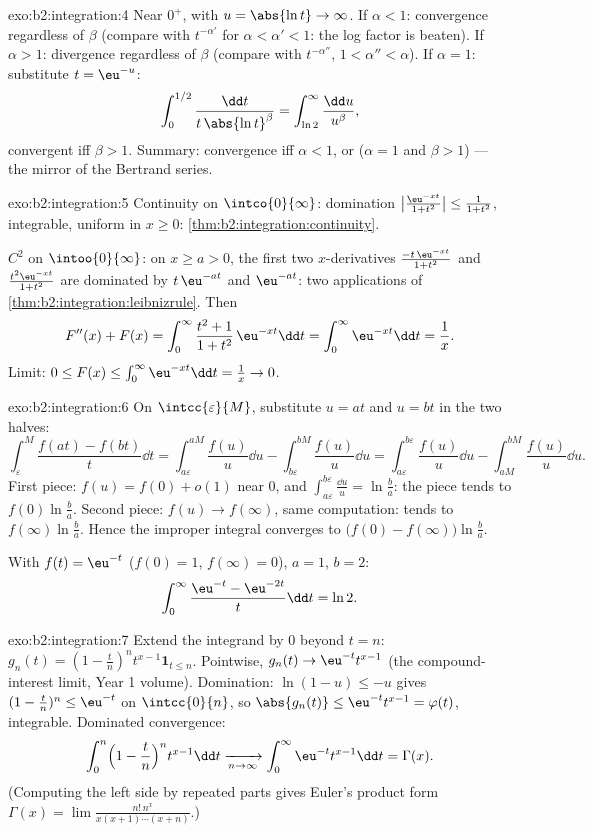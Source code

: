 \begin{solution}{exo:b2:integration:4}
Near $0^+$, with $u = \abs{\ln t} \to \infty$. If $\alpha < 1$:
convergence regardless of $\beta$ (compare with $t^{-\alpha'}$ for
$\alpha < \alpha' < 1$: the log factor is beaten). If $\alpha > 1$:
divergence regardless of $\beta$ (compare with $t^{-\alpha''}$,
$1 < \alpha'' < \alpha$). If $\alpha = 1$: substitute $t =
\eu^{-u}$:
\[
\int_0^{1/2} \frac{\dd t}{t\,\abs{\ln t}^\beta}
= \int_{\ln 2}^{\infty} \frac{\dd u}{u^\beta},
\]
convergent iff $\beta > 1$. Summary: convergence iff $\alpha < 1$,
or ($\alpha = 1$ and $\beta > 1$) --- the mirror of the Bertrand
series.
\end{solution}

\begin{solution}{exo:b2:integration:5}
Continuity on $\intco{0}{\infty}$: domination
$\bigl|\frac{\eu^{-xt}}{1+t^2}\bigr| \leq \frac{1}{1+t^2}$,
integrable, uniform in $x \geq 0$:
\cref{thm:b2:integration:continuity}.

$C^2$ on $\intoo{0}{\infty}$: on $x \geq a > 0$, the first two
$x$-derivatives $\frac{-t\,\eu^{-xt}}{1+t^2}$ and
$\frac{t^2\eu^{-xt}}{1+t^2}$ are dominated by $t\,\eu^{-at}$ and
$\eu^{-at}$: two applications of
\cref{thm:b2:integration:leibnizrule}. Then
\[
F''(x) + F(x) = \int_0^\infty \frac{t^2 + 1}{1 + t^2}\,\eu^{-xt}\dd
t = \int_0^\infty \eu^{-xt}\dd t = \frac1x .
\]
Limit: $0 \leq F(x) \leq \int_0^\infty \eu^{-xt}\dd t = \frac1x \to
0$.
\end{solution}

\begin{solution}{exo:b2:integration:6}
On $\intcc{\varepsilon}{M}$, substitute $u = at$ and $u = bt$ in
the two halves:
\[
\int_\varepsilon^M \frac{f(at) - f(bt)}{t}\dd t
= \int_{a\varepsilon}^{aM}\frac{f(u)}{u}\dd u
- \int_{b\varepsilon}^{bM}\frac{f(u)}{u}\dd u
= \int_{a\varepsilon}^{b\varepsilon} \frac{f(u)}{u}\dd u
- \int_{aM}^{bM} \frac{f(u)}{u}\dd u .
\]
First piece: $f(u) = f(0) + o(1)$ near $0$, and $\int_{a\varepsilon}
^{b\varepsilon} \frac{\dd u}{u} = \ln\frac ba$: the piece tends to
$f(0)\ln\frac ba$. Second piece: $f(u) \to f(\infty)$, same
computation: tends to $f(\infty)\ln\frac ba$. Hence the improper
integral converges to $\bigl(f(0) - f(\infty)\bigr)\ln\frac ba$.

With $f(t) = \eu^{-t}$ ($f(0) = 1$, $f(\infty) = 0$), $a = 1$, $b
= 2$:
\[
\int_0^\infty \frac{\eu^{-t} - \eu^{-2t}}{t}\dd t = \ln 2 .
\]
\end{solution}

\begin{solution}{exo:b2:integration:7}
Extend the integrand by $0$ beyond $t = n$: $g_n(t) = (1 -
\frac tn)^n t^{x-1}\mathbf{1}_{t \leq n}$. Pointwise, $g_n(t) \to
\eu^{-t}t^{x-1}$ (the compound-interest limit, Year 1 volume).
Domination: $\ln(1 - u) \leq -u$ gives $(1 - \frac tn)^n \leq
\eu^{-t}$ on $\intcc{0}{n}$, so $\abs{g_n(t)} \leq
\eu^{-t}t^{x-1} = \varphi(t)$, integrable. Dominated convergence:
\[
\int_0^n \Bigl(1 - \frac tn\Bigr)^n t^{x-1}\dd t
\xrightarrow[n\to\infty]{} \int_0^\infty \eu^{-t}t^{x-1}\dd t
= \Gamma(x) .
\]
(Computing the left side by repeated parts gives Euler's product
form $\Gamma(x) = \lim \frac{n!\,n^x}{x(x+1)\cdots(x+n)}$.)
\end{solution}

